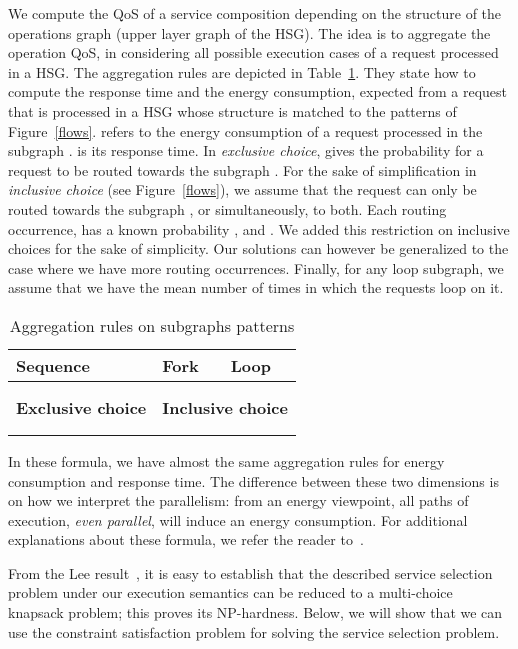 \documentclass[a4paper]{article}
\begin{document}
We compute the QoS of a service composition depending on the structure of the operations 
graph (upper layer graph of the HSG). The idea is to aggregate the operation QoS, in considering all possible execution cases 
of a request processed in a HSG. The aggregation rules are depicted in Table~\ref{tabAggRules}. 
They state how to compute the response time and the energy consumption,  
expected from a request that is processed in a HSG whose structure 
is matched to the patterns of Figure~\ref{flows}.
 refers to the energy consumption of a request processed in the subgraph . 
 is its response time. In {\it exclusive choice},   gives the probability for a request to be routed towards the subgraph .  
For the sake of simplification in {\it inclusive choice} (see Figure~\ref{flows}), we  assume  that the request can only be routed towards the subgraph 
,  or simultaneously, to both. Each routing occurrence, has  
a known probability ,  and . We added this restriction on inclusive choices for the sake of 
simplicity. Our solutions can however be generalized to the case where we have more routing occurrences. 
Finally, for any loop subgraph, we assume that we have 
the mean number  of times in which the requests loop on it. 
\begin{table}[htbp]
\centering
\begin{tabular}{|p{4cm}|p{4cm}|p{2cm}|} 
\hline
\small \textbf{Sequence}   & \small \textbf{Fork}  & \small \textbf{Loop} \\\hline
 &  &  \\
 &  &  \\\hline
\small \textbf{Exclusive choice} &  \multicolumn{2}{c|}{\small \textbf{Inclusive choice}} \\\hline
   & \multicolumn{2}{c|}{  }  \\
   & \multicolumn{2}{c|}{}  \\\hline
\end{tabular}
\caption{Aggregation rules on subgraphs patterns}\label{tabAggRules}
\end{table}
\normalsize

In these formula, we have almost the same aggregation rules for energy consumption and 
response time. The difference between these two dimensions is on how we interpret the parallelism: 
from an energy viewpoint, all paths of execution, {\it even parallel}, will induce an energy consumption. 
For additional explanations about these formula, we refer the reader to~\cite{JISA}. 

From the Lee result~\cite{Lee}, it is easy to establish that the described service selection 
problem under our execution semantics can be reduced to a multi-choice knapsack problem; this  
proves its NP-hardness. Below, we will show that we can use the constraint satisfaction problem 
for solving the service selection problem. 
\end{document}
